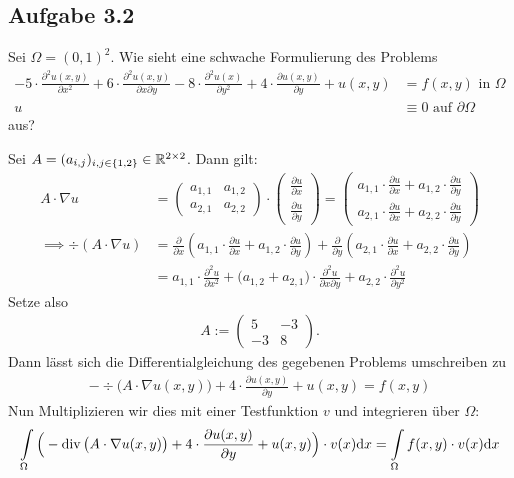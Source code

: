 \subsection{Aufgabe 3.2}
Sei $\Omega=(0,1)^2$. Wie sieht eine schwache Formulierung des Problems
\begin{align*}
	-5\cdot\frac{\partial^2 u(x,y)}{\partial x^2}+6\cdot\frac{\partial^2 u(x,y)}{\partial x\partial y}-8\cdot\frac{\partial^2 u(x)}{\partial y^2}+4\cdot\frac{\partial u(x,y)}{\partial y}+u(x,y)&=f(x,y) \text{ in }\Omega\\
	u&\equiv 0\text{ auf }\partial\Omega
\end{align*}
aus?

\begin{lösung}
	Sei $A=(a_{i,j})_{i,j\in\lbrace1,2\rbrace}\in\mathbb{R}^{2\times 2}$. 
	Dann gilt:
	\begin{align*}
		A\cdot\nabla u&=\begin{pmatrix}
			a_{1,1} & a_{1,2}\\
			a_{2,1} & a_{2,2}
		\end{pmatrix}\cdot\begin{pmatrix}
			\frac{\partial u}{\partial x}\\
			\frac{\partial u}{\partial y}
		\end{pmatrix}=\begin{pmatrix}
			a_{1,1}\cdot\frac{\partial u}{\partial x}+a_{1,2}\cdot\frac{\partial u}{\partial y}\\
			a_{2,1}\cdot\frac{\partial u}{\partial x}+a_{2,2}\cdot\frac{\partial u}{\partial y}
		\end{pmatrix}\\
		\implies
		\div(A\cdot\nabla u)&=\frac{\partial}{\partial x}\left(a_{1,1}\cdot\frac{\partial u}{\partial x}+a_{1,2}\cdot\frac{\partial u}{\partial y}\right)+\frac{\partial}{\partial y}\left(a_{2,1}\cdot\frac{\partial u}{\partial x}+a_{2,2}\cdot\frac{\partial u}{\partial y}\right)\\
		&=a_{1,1}\cdot\frac{\partial^2 u}{\partial x^2}+\big(a_{1,2}+a_{2,1}\big)\cdot\frac{\partial^2 u}{\partial x\partial y}+a_{2,2}\cdot\frac{\partial^2 u}{\partial y^2}
	\end{align*}
	Setze also 
	\begin{align*}
		A:=\begin{pmatrix}
			5 & -3\\
			-3 & 8
		\end{pmatrix}.
	\end{align*}
	Dann lässt sich die Differentialgleichung des gegebenen Problems umschreiben zu 
	\begin{align*}
		-\div\big(A\cdot\nabla u(x,y)\big)+4\cdot\frac{\partial u(x,y)}{\partial y}+u(x,y)=f(x,y)
	\end{align*}
	Nun Multiplizieren wir dies mit einer Testfunktion $v$ und integrieren über $\Omega$:
	\begin{align*}
		\int\limits_\Omega\Big(-\operatorname{div}\big(A\cdot\nabla u(x,y)\big)+4\cdot\frac{\partial u(x,y)}{\partial y}+u(x,y)\Big)\cdot v(x)\mathrm{d} x=\int\limits_\Omega f(x,y)\cdot v(x)\mathrm{d} x
	\end{align*}
\end{lösung}

